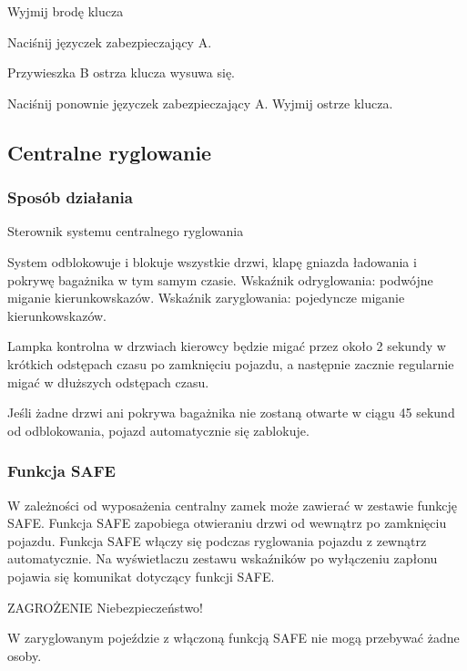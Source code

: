 Wyjmij brodę klucza


\begin{itemizeArrow}
	\itemArrow Naciśnij języczek zabezpieczający A.
\end{itemizeArrow}
Przywieszka B ostrza klucza wysuwa się.
\begin{itemizeArrow}
	\itemArrow Naciśnij ponownie języczek zabezpieczający A.
	\itemArrow Wyjmij ostrze klucza.
\end{itemizeArrow}

\subsection{Centralne ryglowanie}

\subsubsection{Sposób działania}

Sterownik systemu centralnego ryglowania

System odblokowuje i blokuje wszystkie drzwi, klapę gniazda ładowania i pokrywę bagażnika w tym samym czasie.
Wskaźnik odryglowania: podwójne miganie kierunkowskazów.
Wskaźnik zaryglowania: pojedyncze miganie kierunkowskazów.

Lampka kontrolna w drzwiach kierowcy będzie migać przez około 2 sekundy w krótkich odstępach czasu po zamknięciu pojazdu, a następnie zacznie regularnie migać w dłuższych odstępach czasu.

Jeśli żadne drzwi ani pokrywa bagażnika nie zostaną otwarte w ciągu 45 sekund od odblokowania, pojazd automatycznie się zablokuje.


\subsubsection{Funkcja SAFE}

W zależności od wyposażenia centralny zamek może zawierać w zestawie funkcję SAFE.
Funkcja SAFE zapobiega otwieraniu drzwi od wewnątrz po zamknięciu pojazdu.
Funkcja SAFE włączy się podczas ryglowania pojazdu z zewnątrz automatycznie.
Na wyświetlaczu zestawu wskaźników po wyłączeniu zapłonu pojawia się komunikat dotyczący funkcji SAFE.

ZAGROŻENIE
Niebezpieczeństwo!
\begin{itemizeTriangle}
	\itemTriangle W zaryglowanym pojeździe z włączoną funkcją SAFE nie mogą przebywać żadne osoby.
\end{itemizeTriangle}


